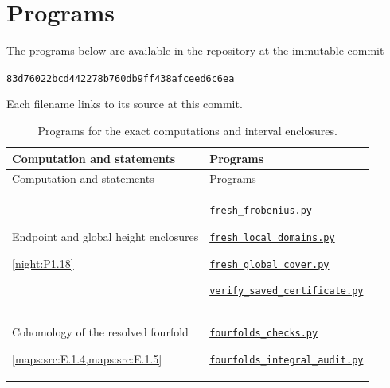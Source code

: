 \documentclass[11pt,a4paper]{article}
\numberwithin{equation}{section}
\theoremstyle{definition}
\newcommand{\SsixRepositoryCommit}{83d76022bcd442278b760db9ff438afceed6c6ea}
\begin{document}
\clearpage
\section*{Programs}
The programs below are available in the \href{https://github.com/KokunoYumeto/s6-complex-structure-workbench/tree/\SsixRepositoryCommit}{repository} at the immutable commit
\begin{center}\small\texttt{\SsixRepositoryCommit}\end{center}
Each filename links to its source at this commit.
\begingroup\small
\setlength{\tabcolsep}{4pt}
\begin{longtable}{@{}p{}p{}@{}}
\caption{Programs for the exact computations and interval enclosures.}\label{tab:V:programs}\\
\toprule Computation and statements & Programs \\\midrule
\endfirsthead
\toprule Computation and statements & Programs \\\midrule
\endhead
\bottomrule\endfoot
\hypertarget{prog:V:height}{}Endpoint and global height enclosures\par \cref{night:P1.18} &
\href{https://github.com/KokunoYumeto/s6-complex-structure-workbench/blob/\SsixRepositoryCommit/pro_returns/S6_SERIES_GRIND_checkpoint_10_20261120T0211Z/code/paper_v/fresh_frobenius.py}{\nolinkurl{fresh_frobenius.py}}\par \href{https://github.com/KokunoYumeto/s6-complex-structure-workbench/blob/\SsixRepositoryCommit/pro_returns/S6_SERIES_GRIND_checkpoint_10_20261120T0211Z/code/paper_v/fresh_local_domains.py}{\nolinkurl{fresh_local_domains.py}}\par \href{https://github.com/KokunoYumeto/s6-complex-structure-workbench/blob/\SsixRepositoryCommit/pro_returns/S6_SERIES_GRIND_checkpoint_10_20261120T0211Z/code/paper_v/fresh_global_cover.py}{\nolinkurl{fresh_global_cover.py}}\par \href{https://github.com/KokunoYumeto/s6-complex-structure-workbench/blob/\SsixRepositoryCommit/pro_returns/S6_SERIES_GRIND_checkpoint_10_20261120T0211Z/code/paper_v/verify_saved_certificate.py}{\nolinkurl{verify_saved_certificate.py}} \\[3pt]
\hypertarget{prog:V:resolved}{}Cohomology of the resolved fourfold\par \cref{maps:src:E.1.4,maps:src:E.1.5} &
\href{https://github.com/KokunoYumeto/s6-complex-structure-workbench/blob/\SsixRepositoryCommit/pro_returns/S6_10_PAPERS_checkpoint_15_20261119T1045Z/S6_10_PAPERS/code/V/replay_chains/code/fourfolds_checks.py}{\nolinkurl{fourfolds_checks.py}}\par \href{https://github.com/KokunoYumeto/s6-complex-structure-workbench/blob/\SsixRepositoryCommit/pro_returns/S6_10_PAPERS_checkpoint_15_20261119T1045Z/S6_10_PAPERS/code/V/replay_chains/code/fourfolds_integral_audit.py}{\nolinkurl{fourfolds_integral_audit.py}} \\[3pt]

\end{longtable}
\end{document}
